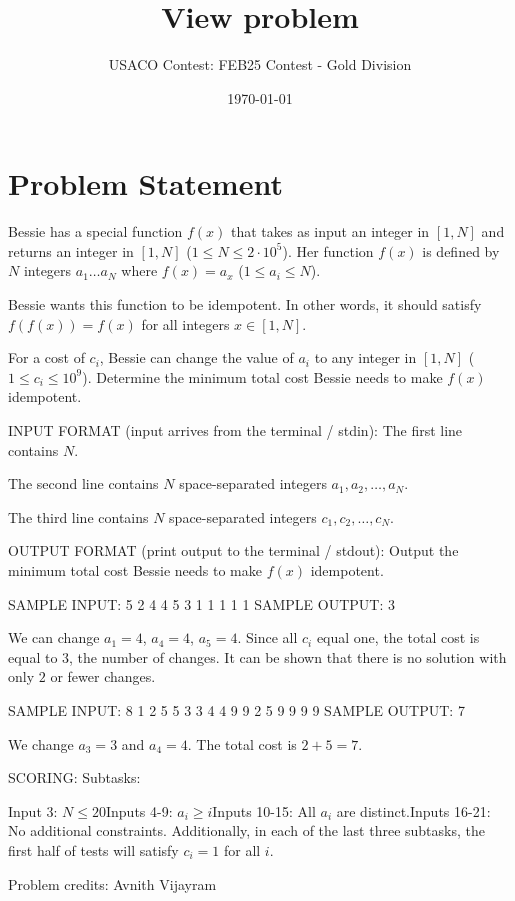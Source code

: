 \documentclass[12pt]{article}
\title{View problem}
\author{USACO Contest: FEB25 Contest - Gold Division}
\date{\today}
\begin{document}
\maketitle

\section*{Problem Statement}


Bessie has a special function $f(x)$ that takes as input an integer in $[1, N]$
and  returns an integer in $[1, N]$ ($1 \le N \le 2 \cdot 10^5$). Her function
$f(x)$ is defined by  $N$ integers $a_1 \ldots a_N$ where $f(x) = a_x$
($1 \le a_i \le N$).  

Bessie wants this function to be idempotent. In other words, it should satisfy
$f(f(x)) = f(x)$  for all integers $x \in [1, N]$. 

For a cost of $c_i$, Bessie can change the value of $a_i$ to any integer in
$[1, N]$ ($1 \le c_i \le 10^9$). Determine the minimum total cost Bessie needs 
to make $f(x)$ idempotent.

INPUT FORMAT (input arrives from the terminal / stdin):
The first line contains $N$.

The second line contains $N$ space-separated integers $a_1,a_2,\dots,a_N$.

The third line contains $N$ space-separated integers $c_1,c_2,\dots,c_N$.


OUTPUT FORMAT (print output to the terminal / stdout):
Output the minimum total cost Bessie needs to make $f(x)$ idempotent.


SAMPLE INPUT:
5
2 4 4 5 3
1 1 1 1 1
SAMPLE OUTPUT: 
3

We can change $a_1 = 4$, $a_4 = 4$, $a_5 = 4$. Since all $c_i$ equal one, the
total cost is equal to $3$, the number of changes. It can be shown that there is
no solution with only $2$ or fewer changes.

SAMPLE INPUT:
8
1 2 5 5 3 3 4 4
9 9 2 5 9 9 9 9
SAMPLE OUTPUT: 
7

We change $a_3 = 3$ and $a_4 = 4$. The total cost is $2+5=7$.

SCORING:
Subtasks:

Input 3: $N\le 20$Inputs 4-9: $a_i\ge i$Inputs 10-15: All $a_i$ are distinct.Inputs 16-21: No additional constraints.
Additionally, in each of the last three subtasks, the first half of tests  will
satisfy $c_i=1$ for all $i$.



Problem credits: Avnith Vijayram
\end{document}
